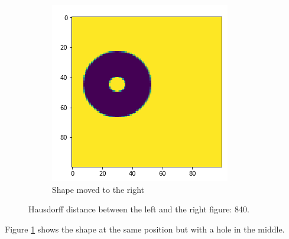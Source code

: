 \begin{figure}[H]
\begin{subfigure}{.35\textwidth}
        \includegraphics[width=\linewidth]{chapters/06_hdm/images/hdm_hole.png}
        \caption{Shape moved to the right}
    \end{subfigure}
    \caption{Hausdorff distance between the left and the right figure: 840. }
    \label{hdm_hole}
\end{figure}

Figure \ref{hdm_hole} shows the shape at the same position but with a hole in the middle.

